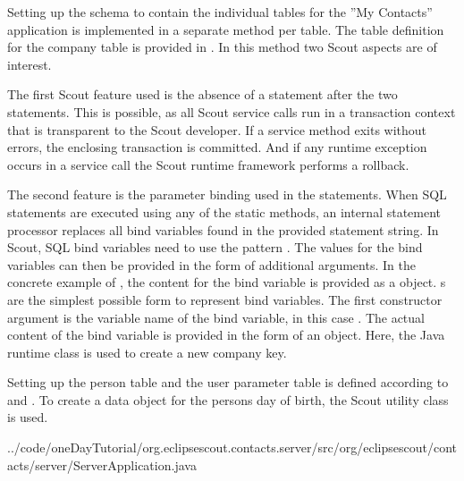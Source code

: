 \documentclass[a4paper,10pt,twoside]{book}
\begin{document}
Setting up the schema to contain the individual tables for the ''My Contacts'' application is implemented in a separate method per table. 
The table definition for the company table is provided in . 
In this method two Scout aspects are of interest. 

The first Scout feature used is the absence of a  statement after the two  statements. 
This is possible, as all Scout service calls run in a transaction context that is transparent to the Scout developer. 
If a service method exits without errors, the enclosing transaction is committed. 
And if any runtime exception occurs in a service call the Scout runtime framework performs a rollback.

The second feature is the parameter binding used in the  statements. 
When SQL statements are executed using any of the static  methods, an internal statement processor replaces all bind variables found in the provided statement string. 
In Scout, SQL bind variables need to use the pattern . 
The values for the bind variables can then be provided in the form of additional arguments. 
In the concrete example of , the content for the bind variable  is provided as a  object. 
s are the simplest possible form to represent bind variables. 
The first constructor argument is the variable name of the bind variable, in this case . 
The actual content of the bind variable is provided in the form of an object. 
Here, the Java runtime class  is used to create a new company key. 

Setting up the person table and the user parameter table is defined according to  and . 
To create a data object for the persons day of birth, the Scout utility class  is used.


{../code/oneDayTutorial/org.eclipsescout.contacts.server/src/org/eclipsescout/contacts/server/ServerApplication.java}
\end{document}
